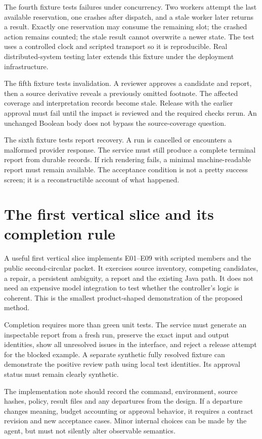 \documentclass[12pt,a4paper,oneside,openany]{book}
\begin{document}
The fourth fixture tests failures under concurrency. Two workers attempt the last
available reservation, one crashes after dispatch, and a stale worker later
returns a result. Exactly one reservation may consume the remaining slot; the
crashed action remains counted; the stale result cannot overwrite a newer state.
The test uses a controlled clock and scripted transport so it is reproducible.
Real distributed-system testing later extends this fixture under the deployment
infrastructure.

The fifth fixture tests invalidation. A reviewer approves a candidate and report,
then a source derivative reveals a previously omitted footnote. The affected
coverage and interpretation records become stale. Release with the earlier
approval must fail until the impact is reviewed and the required checks rerun.
An unchanged Boolean body does not bypass the source-coverage question.

The sixth fixture tests report recovery. A run is cancelled or encounters a
malformed provider response. The service must still produce a complete terminal
report from durable records. If rich rendering fails, a minimal machine-readable
report must remain available. The acceptance condition is not a pretty success
screen; it is a reconstructible account of what happened.

\section{The first vertical slice and its completion rule}

A useful first vertical slice implements E01--E09 with scripted members and the
public second-circular packet. It exercises source inventory, competing candidates,
a repair, a persistent ambiguity, a report and the existing Java path. It does
not need an expensive model integration to test whether the controller's logic
is coherent. This is the smallest product-shaped demonstration of the proposed
method.

Completion requires more than green unit tests. The service must generate an
inspectable report from a fresh run, preserve the exact input and output identities,
show all unresolved issues in the interface, and reject a release attempt for the
blocked example. A separate synthetic fully resolved fixture can demonstrate the
positive review path using local test identities. Its approval status must remain
clearly synthetic.

The implementation note should record the command, environment, source hashes,
policy, result files and any departures from the design. If a departure changes
meaning, budget accounting or approval behavior, it requires a contract revision
and new acceptance cases. Minor internal choices can be made by the agent, but
must not silently alter observable semantics.
\end{document}
